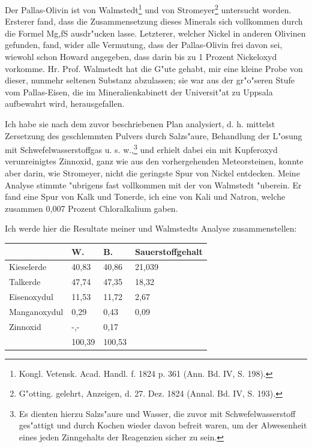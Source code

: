 \documentclass[a4paper, 11pt, oneside]{article}
\begin{document}
Der Pallas-Olivin ist von Walmstedt\footnote{Kongl. Vetensk. Acad. Handl. f. 1824 p. 361 (Ann. Bd. IV, S. 198).} und von Stromeyer\footnote{G"otting. gelehrt, Anzeigen, d. 27. Dez. 1824 (Annal. Bd. IV, S. 193).} untersucht worden. Ersterer fand, dass die Zusammensetzung dieses Minerals sich vollkommen durch die Formel {Mg,f}S ausdr"ucken lasse. Letzterer, welcher Nickel in anderen Olivinen gefunden, fand, wider alle Vermutung, dass der Pallas-Olivin frei davon sei, wiewohl schon Howard angegeben, dass darin bis zu 1 Prozent Nickeloxyd vorkomme. Hr. Prof. Walmstedt hat die G"ute gehabt, mir eine kleine Probe von dieser, nunmehr seltenen Substanz abzulassen; sie war aus der gr"o"seren Stufe vom Pallas-Eisen, die im Mineralienkabinett der Universit"at zu Uppsala aufbewahrt wird, herausgefallen.

Ich habe sie nach dem zuvor beschriebenen Plan analysiert, d. h. mittelst Zersetzung des geschlemmten Pulvers durch Salzs"aure, Behandlung der L"osung mit Schwefelwasserstoffgas u. s. w.,\footnote{Es dienten hierzu Salzs"aure und Wasser, die zuvor mit Schwefelwasserstoff ges"attigt und durch Kochen wieder davon befreit waren, um der Abwesenheit eines jeden Zinngehalts der Reagenzien sicher zu sein.} und erhielt dabei ein mit Kupferoxyd verunreinigtes Zinnoxid, ganz wie aus den vorhergehenden Meteorsteinen, konnte aber darin, wie Stromeyer, nicht die geringste Spur von Nickel entdecken. Meine Analyse stimmte "ubrigens fast vollkommen mit der von Walmstedt "uberein. Er fand eine Spur von Kalk und Tonerde, ich eine von Kali und Natron, welche zusammen 0,007 Prozent Chloralkalium gaben.

Ich werde hier die Resultate meiner und Walmstedts Analyse zusammenstellen:
\begin{center}
\begin{tabular}{ |p{30mm}|p{20mm}|p{20mm}|p{26mm}| }
    \hline
      & W. & B. & Sauerstoffgehalt\\\hline
      Kieselerde & 40,83 & 40,86 & 21,039\\\hline
      Talkerde & 47,74 & 47,35 & 18,32\\\hline
      Eisenoxydul & 11,53 & 11,72 & 2,67\\\hline
      Manganoxydul & 0,29 & 0,43 & 0,09\\\hline
      Zinnoxid & -,- & 0,17  & \\\hline
       & 100,39 & 100,53 & \\
    \hline
\end{tabular}
\end{center}
\end{document}
